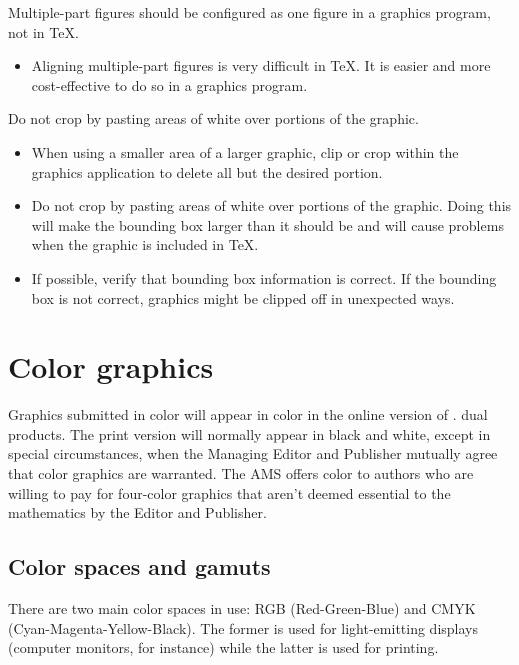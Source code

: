 
%
 {Multiple-part figures should be configured as one figure in a graphics
  program, not in \TeX.}

\begin{itemize}
\item Aligning multiple-part figures is very difficult in \TeX. It is
 easier and more cost-effective to do so in a graphics program.
\end{itemize}

%
{Do not crop by pasting areas of white over portions of the graphic.}

\begin{itemize}
\item When using a smaller area of a larger graphic, clip or crop within
 the graphics application to delete all but the desired portion.
\item Do not crop by pasting areas of white over portions of the graphic.
 Doing this will make the bounding box larger than it should be and will
 cause problems when the graphic is included in \TeX.
\item If possible, verify that bounding box information is correct.
 If the bounding box is not correct, graphics might be clipped off in
 unexpected ways.
\end{itemize}

\ifmonograph
 \section{Color graphics}\label{sec:color}
\else
 {Graphics submitted in color will appear in color in the online version of
 \ifmemoirs \Memos.
 \else dual products.
 \fi
 The print version will normally appear in black and white, except in
 special circumstances, when the
 \ifjournal Managing \fi
 Editor and Publisher mutually agree that color graphics are
 warranted. The AMS offers color to authors who are willing to pay for
 four-color graphics that aren't deemed essential to the mathematics
 by the Editor and Publisher.}
\fi

\subsection{Color spaces and gamuts}

\noindent There are two main color spaces in use: RGB (Red-Green-Blue)
and CMYK (Cyan-Magenta-Yellow-Black). The former is used for
light-emitting displays (computer monitors, for instance) while the
latter is used for printing. 

